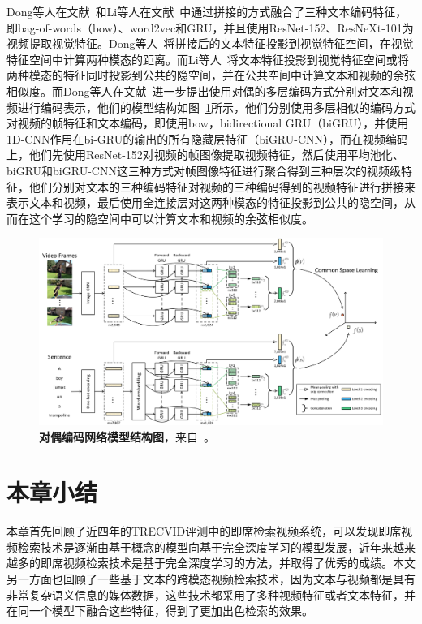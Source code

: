 Dong等人在文献~\cite{dong2018predicting}和Li等人在文献~\cite{li2019w2vv++}中通过拼接的方式融合了三种文本编码特征，即bag-of-words（bow）、word2vec和GRU，并且使用ResNet-152、ResNeXt-101为视频提取视觉特征。Dong等人~\cite{dong2018predicting}将拼接后的文本特征投影到视觉特征空间，在视觉特征空间中计算两种模态的距离。而Li等人~\cite{li2019w2vv++}将文本特征投影到视觉特征空间或将两种模态的特征同时投影到公共的隐空间，并在公共空间中计算文本和视频的余弦相似度。而Dong等人在文献~\cite{dong2019dual}进一步提出使用对偶的多层编码方式分别对文本和视频进行编码表示，他们的模型结构如图~\ref{fig:related_dong2019}所示，他们分别使用多层相似的编码方式对视频的帧特征和文本编码，即使用bow，bidirectional GRU（biGRU），并使用1D-CNN作用在bi-GRU的输出的所有隐藏层特征（biGRU-CNN），而在视频编码上，他们先使用ResNet-152对视频的帧图像提取视频特征，然后使用平均池化、biGRU和biGRU-CNN这三种方式对帧图像特征进行聚合得到三种层次的视频级特征，他们分别对文本的三种编码特征对视频的三种编码得到的视频特征进行拼接来表示文本和视频，最后使用全连接层对这两种模态的特征投影到公共的隐空间，从而在这个学习的隐空间中可以计算文本和视频的余弦相似度。

\begin{figure}[tbh!]
    \centering
    \includegraphics[width=\linewidth]{figures/related_dong2019}
    \caption[Dong等人~\cite{dong2019dual}的对偶编码网络模型结构图]{\textbf{对偶编码网络模型结构图}，来自~\cite{dong2019dual}。}
    \label{fig:related_dong2019}
\end{figure}

\section{本章小结}
本章首先回顾了近四年的TRECVID评测中的即席检索视频系统，可以发现即席视频检索技术是逐渐由基于概念的模型向基于完全深度学习的模型发展，近年来越来越多的即席视频检索技术是基于完全深度学习的方法，并取得了优秀的成绩。本文另一方面也回顾了一些基于文本的跨模态视频检索技术，因为文本与视频都是具有非常复杂语义信息的媒体数据，这些技术都采用了多种视频特征或者文本特征，并在同一个模型下融合这些特征，得到了更加出色检索的效果。
